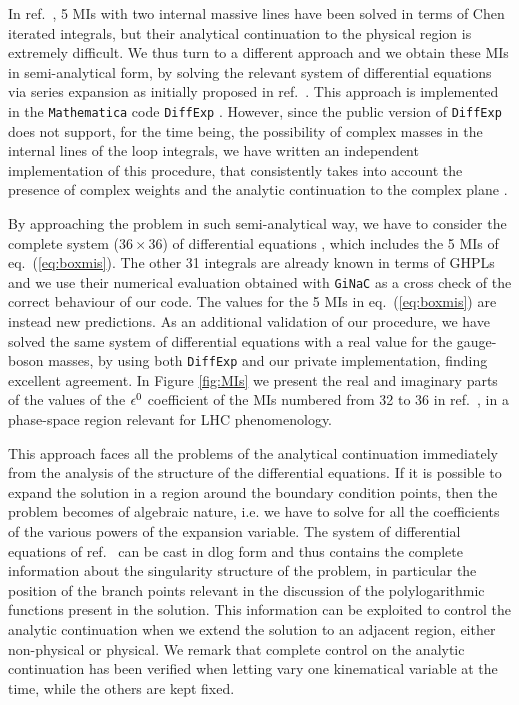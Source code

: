 \documentclass[11pt,a4paper]{article}
\begin{document}
In ref.~\cite{Bonciani:2016ypc}, 5 MIs with two internal massive lines
have been solved in terms of Chen iterated integrals,
but their analytical continuation to
the physical region is extremely difficult.
We thus turn to a different approach and we obtain these MIs in semi-analytical form,
by solving the relevant system of differential equations via series expansion as initially proposed in ref.~\cite{Moriello:2019yhu}.
This approach is implemented in the {\tt Mathematica} code {\tt DiffExp} \cite{Hidding:2020ytt}.
However, since the public version of {\tt DiffExp} does not support, for the time being, the possibility of complex masses in the internal lines of the loop integrals, we have written an independent implementation of this procedure,
that consistently takes into account the presence of complex weights and the analytic continuation to the complex plane \cite{SeaFire}.


%
By approaching the problem in such semi-analytical way,
we have to consider the complete system ($36 \times 36$)
of differential equations \cite{Bonciani:2016ypc},
which includes the 5 MIs of  eq.~(\ref{eq:boxmis}).
The other 31 integrals are already known in terms of GHPLs
and we use their numerical evaluation obtained
with {\tt GiNaC} \cite{Vollinga:2004sn}
as a cross check of the correct behaviour of our code.
The values for the 5 MIs in eq.~(\ref{eq:boxmis}) are instead new predictions.
As an additional validation of our procedure,
we have solved the same system of differential equations
with a real value for the gauge-boson masses,
by using both {\tt DiffExp} and our private implementation,
finding excellent agreement.
In Figure \ref{fig:MIs} we present the real and imaginary parts
of the values of the $\epsilon^0$ coefficient of the MIs numbered from 32 to 36 in ref.~\cite{Bonciani:2016ypc},
in a phase-space region relevant for LHC phenomenology.

This approach faces all the problems of the analytical continuation
immediately from the analysis of the structure of the differential equations.
If it is possible to expand the solution in a region around
the boundary condition points,
then the problem becomes of algebraic nature,
i.e. we have to solve for all the coefficients of the various powers
of the expansion variable.
The system of differential equations of ref.~\cite{Bonciani:2016ypc}
can be cast in dlog form and thus contains the complete information
about the singularity structure of the problem,
in particular the position of the branch points relevant
in the discussion of the polylogarithmic functions present in the solution.
This information can be exploited to control the analytic continuation when
we extend the solution to an adjacent region, either non-physical or physical.
We remark that complete control on the analytic continuation has been verified
when letting vary one kinematical variable at the time,
while the others are kept fixed.
%
\end{document}
